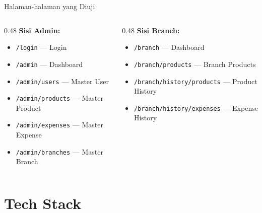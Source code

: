 \documentclass[aspectratio=169]{beamer}
\begin{document}
\begin{frame}{Halaman-halaman yang Diuji}
  \begin{columns}[T]
    \begin{column}{0.48\textwidth}
      \textbf{Sisi Admin:}
      \begin{itemize}
        \item \texttt{/login} — Login
        \item \texttt{/admin} — Dashboard
        \item \texttt{/admin/users} — Master User
        \item \texttt{/admin/products} — Master Product
        \item \texttt{/admin/expenses} — Master Expense
        \item \texttt{/admin/branches} — Master Branch
      \end{itemize}
    \end{column}
    \begin{column}{0.48\textwidth}
      \textbf{Sisi Branch:}
      \begin{itemize}
        \item \texttt{/branch} — Dashboard
        \item \texttt{/branch/products} — Branch Products
        \item \texttt{/branch/history/products} — Product History
        \item \texttt{/branch/history/expenses} — Expense History
      \end{itemize}
    \end{column}
  \end{columns}
\end{frame}

\section{Tech Stack}
\end{document}

